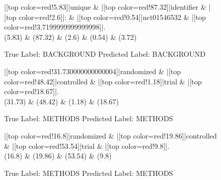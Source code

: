 \documentclass[a4paper, landscape]{article}
\begin{document}
\clearpage
\begin{figure}
\begin{center}
\begin{dependency}
\begin{deptext}
|[top color=red!5.83]|unique \& |[top color=red!87.32]|identifier \& |[top color=red!2.6]|: \& |[top color=red!0.54]|nct01546532 \& |[top color=red!3.7199999999999998]|.\\
(5.83) \& (87.32) \& (2.6) \& (0.54) \& (3.72)\\
\end{deptext}
\end{dependency}
\end{center}
\caption{True Label: BACKGROUND Predicted Label: BACKGROUND}
\end{figure}
\clearpage
\begin{figure}
\begin{center}
\begin{dependency}
\begin{deptext}
|[top color=red!31.730000000000004]|randomized \& |[top color=red!48.42]|controlled \& |[top color=red!1.18]|trial \& |[top color=red!18.67]|.\\
(31.73) \& (48.42) \& (1.18) \& (18.67)\\
\end{deptext}
\end{dependency}
\end{center}
\caption{True Label: METHODS Predicted Label: METHODS}
\end{figure}
\clearpage
\begin{figure}
\begin{center}
\begin{dependency}
\begin{deptext}
|[top color=red!16.8]|randomized \& |[top color=red!19.86]|controlled \& |[top color=red!53.54]|trial \& |[top color=red!9.8]|.\\
(16.8) \& (19.86) \& (53.54) \& (9.8)\\
\end{deptext}
\end{dependency}
\end{center}
\caption{True Label: METHODS Predicted Label: METHODS}
\end{figure}
\end{document}

